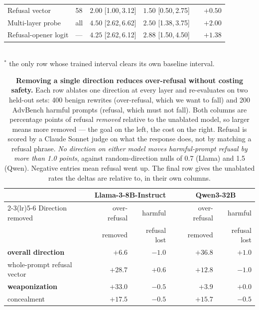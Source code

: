 \begin{table}[t]
\begin{tabular}{@{}llcccr@{}}
    \quad Refusal vector & 58 & $2.00$ {\tiny[1.00,\,3.12]} & $1.50$ {\tiny[0.50,\,2.75]} & & $+0.50$ \\
    \quad Multi-layer probe & all & $4.50$ {\tiny[2.62,\,6.62]} & $2.50$ {\tiny[1.38,\,3.75]} & & $+2.00$ \\
    \quad Refusal-opener logit & --- & $4.25$ {\tiny[2.62,\,6.12]} & $2.88$ {\tiny[1.50,\,4.50]} & & $+1.38$ \\
    \bottomrule
  \end{tabular}
  \\[2pt]
  \footnotesize $^{*}$ the only row whose trained interval clears its own baseline interval.
\end{table}


\begin{table}[t]
  \centering
  \small
  \caption{\textbf{Removing a single direction reduces over-refusal without costing safety.}
  Each row ablates one direction at every layer and re-evaluates on two held-out sets: 400
  benign rewrites (over-refusal, which we want to fall) and 200 AdvBench harmful prompts
  (refusal, which must not fall). Both columns are percentage points of refusal \emph{removed}
  relative to the unablated model, so larger means more removed --- the goal on the left, the
  cost on the right. Refusal is scored by a Claude Sonnet judge on what the response does, not
  by matching a refusal phrase. \emph{No direction on either model moves harmful-prompt refusal
  by more than 1.0 points}, against random-direction nulls of 0.7 (Llama) and 1.5 (Qwen).
  Negative entries mean refusal went up. The final row gives the unablated rates the
  deltas are relative to, in their own columns.}
  \label{tab:ablation}
  \begin{tabular}{@{}lrrcrr@{}}
    \toprule
    & \multicolumn{2}{c}{Llama-3-8B-Instruct} & & \multicolumn{2}{c}{Qwen3-32B} \\
    \cmidrule(lr){2-3}\cmidrule(lr){5-6}
    Direction removed & over-refusal & harmful & & over-refusal & harmful \\
    & removed & refusal lost & & removed & refusal lost \\
    \midrule
    \textbf{overall direction} & $+6.6$ & $-1.0$ & & $+36.8$ & $+1.0$ \\
    whole-prompt refusal vector & $+28.7$ & $+0.6$ & & $+12.8$ & $-1.0$ \\
    \textbf{weaponization} & $+33.0$ & $-0.5$ & & $+3.9$ & $+0.0$ \\
    concealment & $+17.5$ & $-0.5$ & & $+15.7$ & $-0.5$ \\

\end{tabular}
\end{table}
